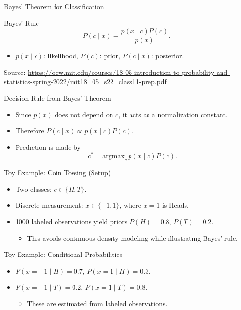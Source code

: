 \documentclass[10pt]{beamer}
\begin{document}
\begin{frame}{Bayes' Theorem for Classification}
    \justifying
    \begin{conceptbox}{Bayes' Rule}
        \begin{equation}
        P(c \mid x) = \frac{p(x \mid c)P(c)}{p(x)}.
        \end{equation}
    \end{conceptbox}
    \begin{itemize}
        \item $p(x \mid c)$: likelihood, $P(c)$: prior, $P(c \mid x)$: posterior.
    \end{itemize}
    \vspace{0.5em}
    {\footnotesize Source: \url{https://ocw.mit.edu/courses/18-05-introduction-to-probability-and-statistics-spring-2022/mit18_05_s22_class11-prep.pdf}}
\end{frame}

\begin{frame}{Decision Rule from Bayes' Theorem}
    \justifying
    \begin{itemize}
        \item Since $p(x)$ does not depend on $c$, it acts as a normalization constant.
        \item Therefore $P(c \mid x) \propto p(x \mid c) P(c)$.
        \item Prediction is made by
        \[c^* = \mathrm{argmax}_c\, p(x \mid c)P(c).\]
    \end{itemize}
\end{frame}

\begin{frame}{Toy Example: Coin Tossing (Setup)}
    \justifying
    \begin{itemize}
        \item Two classes: $c \in \{H, T\}$.
        \item Discrete measurement: $x \in \{-1, 1\}$, where $x=1$ is Heads.
        \item 1000 labeled observations yield priors $P(H)=0.8$, $P(T)=0.2$.
        \begin{itemize}
            \item This avoids continuous density modeling while illustrating Bayes' rule.
        \end{itemize}
    \end{itemize}
\end{frame}

\begin{frame}{Toy Example: Conditional Probabilities}
    \justifying
    \begin{itemize}
        \item $P(x=-1 \mid H) = 0.7$, $P(x=1 \mid H) = 0.3$.
        \item $P(x=-1 \mid T) = 0.2$, $P(x=1 \mid T) = 0.8$.
        \begin{itemize}
            \item These are estimated from labeled observations.
        \end{itemize}
    \end{itemize}
\end{frame}
\end{document}
